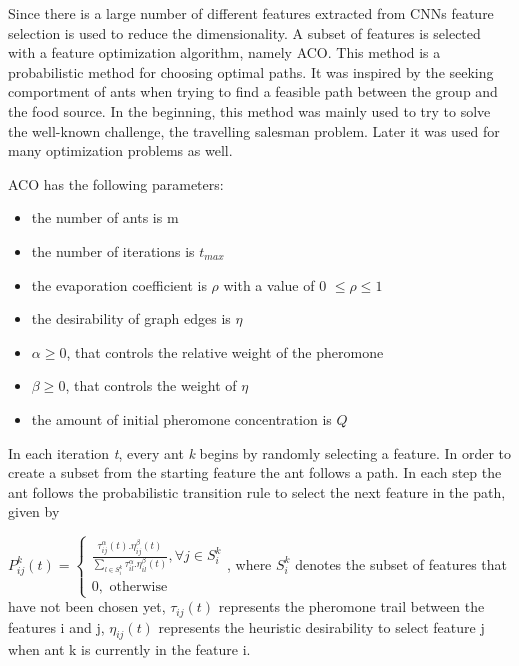 Since there is a large number of different features extracted from CNNs feature selection is used to reduce the dimensionality. A subset of features is selected with a feature optimization algorithm, namely ACO. This method is a probabilistic method for choosing optimal paths. It was inspired by the seeking comportment of ants when trying to find a feasible path between the group and the food source. In the beginning, this method was mainly used to try to solve the well-known challenge, the travelling salesman problem. Later it was used for many optimization problems as well.

ACO has the following parameters:
\begin{itemize}

    \item{the number of ants is m}
    \item{the number of iterations is $t_{max}$}
    \item{the evaporation coefficient is $\rho$ with a value of 0 $\le \rho \le 1$}
    \item{the desirability of graph edges is $\eta$}
    \item{$\alpha \ge 0$, that controls the relative weight of the pheromone}
    \item{$\beta \ge 0$, that controls the weight of $\eta$}
    \item{the amount of initial pheromone concentration is $Q$}

\end{itemize}

In each iteration \emph{t}, every ant \emph{k} begins by randomly selecting a feature. In order to create a subset from the starting feature the ant follows a path. In each step the ant follows the probabilistic transition rule to select the next feature in the path, given by 

$P_{ij}^k\left(t\right)=\left\{\begin{array}{l}\frac{\tau_{ij}^\alpha\left(t\right).\eta_{ij}^\beta\left(t\right)}{\sum_{l\in S_i^k}\tau_{il}^\alpha.\eta_{il}^\beta\left(t\right)},\forall j\in S_i^k\\0,\,\,{\text{otherwise}}\end{array}\right.$,
where $S_{i}^{k}$ denotes the subset of features that have not been chosen yet, $\tau_{ij}(t)$ represents the pheromone trail between the features i and j, $\eta_{ij}(t)$ represents the heuristic desirability to select feature j when ant k is currently in the feature i.

